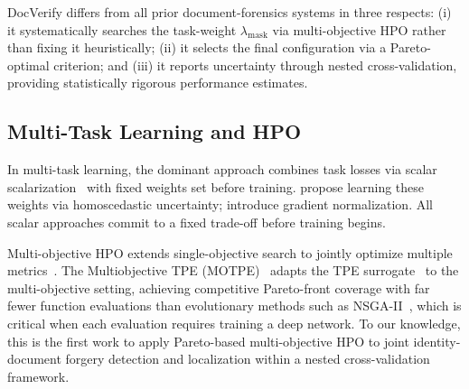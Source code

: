DocVerify differs from all prior document-forensics systems in three respects:
(i) it systematically searches the task-weight $\lambda_{\text{mask}}$ via
multi-objective HPO rather than fixing it heuristically; (ii) it selects the
final configuration via a Pareto-optimal criterion; and (iii) it reports
uncertainty through nested cross-validation, providing statistically rigorous
performance estimates.

\subsection{Multi-Task Learning and HPO}

In multi-task learning, the
dominant approach combines task losses via scalar scalarization~\citep{marler2004survey}
with fixed weights set before training. \citet{kendall2018multi} propose
learning these weights via homoscedastic uncertainty; \citet{liu2019end}
introduce gradient normalization. All scalar approaches commit to a fixed
trade-off before training begins.

Multi-objective HPO extends single-objective search to jointly optimize multiple
metrics~\citep{miettinen1999nonlinear}. The Multiobjective TPE
(MOTPE)~\citep{motpe2022} adapts the TPE surrogate~\citep{tpe2011} to the
multi-objective setting, achieving competitive Pareto-front coverage with far
fewer function evaluations than evolutionary methods such as
NSGA-II~\citep{nsga2_2002}, which is critical when each evaluation requires
training a deep network. To our knowledge, this is the first work to apply Pareto-based
multi-objective HPO to joint identity-document forgery detection and
localization within a nested cross-validation framework.
